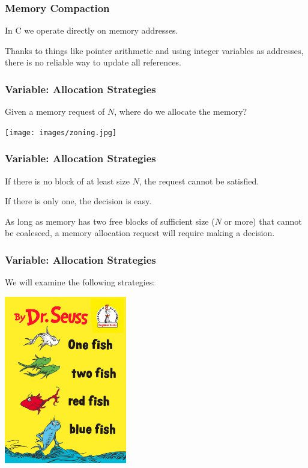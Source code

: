 \begin{frame}
\frametitle{Memory Compaction}


In C we operate directly on memory addresses. 

Thanks to things like pointer arithmetic and using integer variables as addresses, there is no reliable way to update all references.


\end{frame}

\begin{frame}
\frametitle{Variable: Allocation Strategies}

Given a memory request of $N$, where do we allocate the memory? 

\begin{center}
	\texttt{[image: images/zoning.jpg]}
\end{center}

\end{frame}

\begin{frame}
\frametitle{Variable: Allocation Strategies}

If there is no block of at least size $N$, the request cannot be satisfied. 

If there is only one, the decision is easy.

As long as memory has two free blocks of sufficient size ($N$ or more) that cannot be coalesced, a memory allocation request will require making a decision.


\end{frame}

\begin{frame}
\frametitle{Variable: Allocation Strategies}

We will examine the following strategies:

\begin{center}
	\includegraphics[width=0.4\textwidth]{images/seuss.jpg}
\end{center}

\end{frame}

